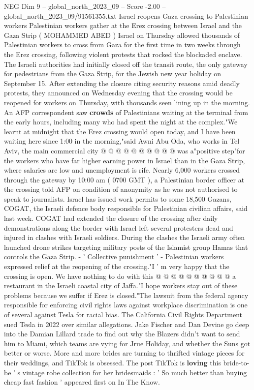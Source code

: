 \begin{textsample}{NEG Dim 9 – global\_north\_2023\_09 – Score -2.00 – global\_north\_2023\_09/91561355.txt}  \label{ex:f9_neg_432}
Israel reopens Gaza crossing to Palestinian workers Palestinian workers gather at the Erez crossing between Israel and the Gaza Strip ( MOHAMMED ABED ) Israel on Thursday allowed thousands of Palestinian workers to cross from Gaza for the first time in two weeks through the Erez crossing, following violent protests that rocked the blockaded enclave.
The Israeli authorities had initially closed off the transit route, the only gateway for pedestrians from the Gaza Strip, for the Jewish new year holiday on September 15.
After extending the closure citing security reasons amid deadly protests, they announced on Wednesday evening that the crossing would be reopened for workers on Thursday, with thousands seen lining up in the morning.
An AFP correspondent saw \textbf{crowds} of Palestinians waiting at the terminal from the early hours, including many who had spent the night at the complex."We learnt at midnight that the Erez crossing would open today, and I have been waiting here since 1:00 in the morning,"said Awni Abu Oda, who works in Tel Aviv, the main commercial city @ @ @ @ @ @ @ @ @ @ was a"positive step"for the workers who have far higher earning power in Israel than in the Gaza Strip, where salaries are low and unemployment is rife.
Nearly 6,000 workers crossed through the gateway by 10:00 am ( 0700 GMT ), a Palestinian border officer at the crossing told AFP on condition of anonymity as he was not authorised to speak to journalists.
Israel has issued work permits to some 18,500 Gazans, COGAT, the Israeli defence body responsible for Palestinian civilian affairs, said last week.
COGAT had extended the closure of the crossing after daily demonstrations along the border with Israel left several protesters dead and injured in clashes with Israeli soldiers.
During the clashes the Israeli army often launched drone strikes targeting military posts of the Islamist group Hamas that controls the Gaza Strip. - ' Collective punishment ' - Palestinian workers expressed relief at the reopening of the crossing."I ' m very happy that the crossing is open.
We have nothing to do with this @ @ @ @ @ @ @ @ @ @ a restaurant in the Israeli coastal city of Jaffa."I hope workers stay out of these problems because we suffer if Erez is closed."The lawsuit from the federal agency responsible for enforcing civil rights laws against workplace discrimination is one of several against Tesla for racial bias.
The California Civil Rights Department sued Tesla in 2022 over similar allegations.
Jake Fischer and Dan Devine go deep into the Damian Lillard trade to find out why the Blazers didn't want to send him to Miami, which teams are vying for Jrue Holiday, and whether the Suns got better or worse.
More and more brides are turning to thrifted vintage pieces for their weddings, and TikTok is obsessed.
The post TikTok is \textbf{loving} this bride-to-be ' s vintage robe collection for her bridesmaids : ' So much better than buying cheap fast fashion ' appeared first on In The Know.

\end{textsample}

